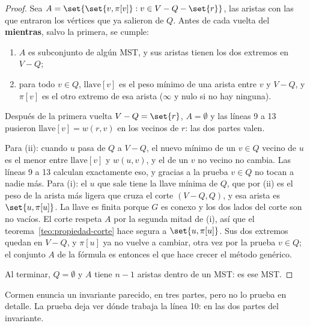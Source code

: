 \documentclass[11pt,letterpaper]{article}
\begin{document}
\begin{proof}
  Sea $A = \set{\set{v, \pi[v]} : v \in V - Q - \set{r}}$, las aristas
  con las que entraron los vértices que ya salieron de $Q$. Antes de
  cada vuelta del \textbf{mientras}, salvo la primera, se cumple:
  \begin{enumerate}[label=(\roman*), itemsep=0.1em]
    \item $A$ es subconjunto de algún MST, y sus aristas tienen los
          dos extremos en $V - Q$;
    \item para todo $v \in Q$, $\text{llave}[v]$ es el peso mínimo de
          una arista entre $v$ y $V - Q$, y $\pi[v]$ es el otro extremo
          de esa arista ($\infty$ y nulo si no hay ninguna).
  \end{enumerate}
  Después de la primera vuelta $V - Q = \set{r}$, $A = \emptyset$ y las
  líneas 9 a 13 pusieron $\text{llave}[v] = w(r, v)$ en los vecinos de
  $r$: las dos partes valen.

  Para (ii): cuando $u$ pasa de $Q$ a $V - Q$, el nuevo mínimo de un
  $v \in Q$ vecino de $u$ es el menor entre $\text{llave}[v]$ y
  $w(u, v)$, y el de un $v$ no vecino no cambia. Las líneas 9 a 13
  calculan exactamente eso, y gracias a la prueba $v \in Q$ no tocan a
  nadie más. Para (i): el $u$ que sale tiene la llave mínima de $Q$,
  que por (ii) es el peso de la arista más ligera que cruza el corte
  $(V - Q, Q)$, y esa arista es $\set{u, \pi[u]}$. La llave es finita
  porque $G$ es conexo y los dos lados del corte son no vacíos. El
  corte respeta $A$ por la segunda mitad de (i), así que el
  teorema~\ref{teo:propiedad-corte} hace segura a $\set{u, \pi[u]}$.
  Sus dos extremos quedan en $V - Q$, y $\pi[u]$ ya no vuelve a
  cambiar, otra vez por la prueba $v \in Q$; el conjunto $A$ de la
  fórmula es entonces el que hace crecer el método genérico.

  Al terminar, $Q = \emptyset$ y $A$ tiene $n - 1$ aristas dentro de
  un MST: es ese MST.
\end{proof}

Cormen enuncia un invariante parecido, en tres partes, pero no lo
prueba en detalle. La prueba deja ver dónde trabaja la línea 10: en
las dos partes del invariante.
\end{document}

